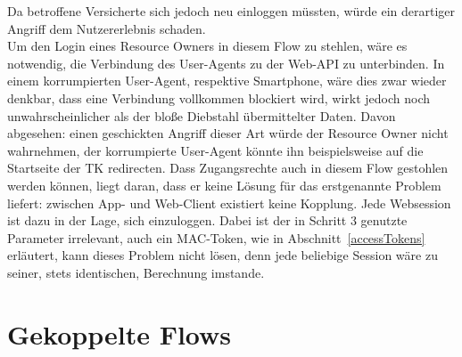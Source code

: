 Da betroffene Versicherte sich jedoch neu einloggen müssten, würde ein
derartiger Angriff dem Nutzererlebnis schaden.
\\
Um den Login eines Resource Owners in diesem Flow zu stehlen, wäre es notwendig,
die Verbindung des User-Agents zu der Web-API zu unterbinden. In einem
korrumpierten User-Agent, respektive Smartphone, wäre dies zwar wieder denkbar,
dass eine Verbindung vollkommen blockiert wird, wirkt jedoch noch
unwahrscheinlicher als der bloße Diebstahl übermittelter Daten. Davon abgesehen:
einen geschickten Angriff dieser Art würde der Resource Owner nicht wahrnehmen,
der korrumpierte User-Agent könnte ihn beispielsweise auf die Startseite der TK
redirecten. Dass Zugangsrechte auch in diesem Flow gestohlen werden können,
liegt daran, dass er keine Lösung für das erstgenannte Problem liefert: zwischen
App- und Web-Client existiert keine Kopplung. Jede Websession ist dazu in der
Lage, sich einzuloggen. Dabei ist der in Schritt 3 genutzte Parameter
irrelevant, auch ein MAC-Token, wie in Abschnitt~\ref{accessTokens} erläutert,
kann dieses Problem nicht lösen, denn jede beliebige Session wäre zu seiner,
stets identischen, Berechnung imstande.
\\

\section{Gekoppelte Flows}\label{ch:GekoppelteFlows}

